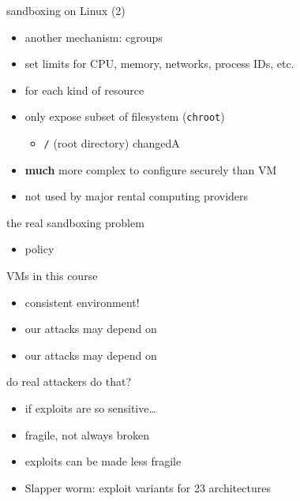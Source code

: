 \begin{frame}{sandboxing on Linux (2)}
    \begin{itemize}
    \item another mechanism: cgroups
    \item set limits for CPU, memory, networks, process IDs, etc.
    \item {} for each kind of resource
    \item only expose subset of filesystem ({\tt chroot})
        \begin{itemize}
        \item {\tt /} (root directory) changedA
        \end{itemize}
    \item \textbf{much} more complex to configure securely than VM
    \item not used by major rental computing providers
    \end{itemize}
\end{frame}

\begin{frame}{the real sandboxing problem}
    \begin{itemize}
    \item policy
    \end{itemize}
\end{frame}


\begin{frame}{VMs in this course}
    \begin{itemize}
    \item consistent environment!
    \item our attacks may depend on 
    \item our attacks may depend on 
    \end{itemize}
\end{frame}

\begin{frame}{do real attackers do that?}
    \begin{itemize}
    \item if exploits are so sensitive\ldots
    \vspace{.5cm}
    \item fragile, not always broken
    \item exploits can be made less fragile
    \item Slapper worm: exploit variants for 23 architectures
    \end{itemize}
\end{frame}

